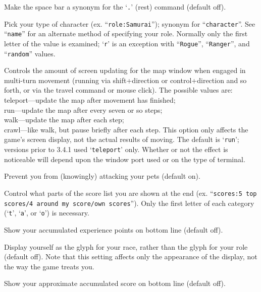 \item[\ib{rest\_on\_space}]
Make the space bar a synonym for the `{\tt .}' (rest) command (default off).

\item[\ib{role}]
Pick your type of character (ex. ``{\tt role:Samurai}'');
synonym for ``{\tt character}''.  See ``{\tt name}'' for an alternate method
of specifying your role.  Normally only the first letter of the
value is examined; `{\tt r}' is an exception with ``{\tt Rogue}'', ``{\tt Ranger}'',
and ``{\tt random}'' values.

\item[\ib{runmode}]
Controls the amount of screen updating for the map window when engaged
in multi-turn movement (running via shift+direction or control+direction
and so forth, or via the travel command or mouse click).
The possible values are:
teleport---update the map after movement has finished;\\
run---update the map after every seven or so steps;\\
walk---update the map after each step;\\
crawl---like walk, but pause briefly after each step.
This option only affects the game's screen display, not the actual
results of moving.  The default is `{\tt run}'; versions prior to 3.4.1 
used `{\tt teleport}' only.  Whether or not the effect is noticeable will
depend upon the window port used or on the type of terminal.

\item[\ib{safe\_pet}]
Prevent you from (knowingly) attacking your pets (default on).

\item[\ib{scores}]
Control what parts of the score list you are shown at the end (ex.
``{\tt scores:5 top scores/4 around my score/own scores}'').  Only the first
letter of each category (`{\tt t}', `{\tt a}', or `{\tt o}') is necessary.

\item[\ib{showexp}]
Show your accumulated experience points on bottom line (default off).

\item[\ib{showrace}]
Display yourself as the glyph for your race, rather than the glyph
for your role (default off).  Note that this setting affects only
the appearance of the display, not the way the game treats you.

\item[\ib{showscore}]
Show your approximate accumulated score on bottom line (default off).


